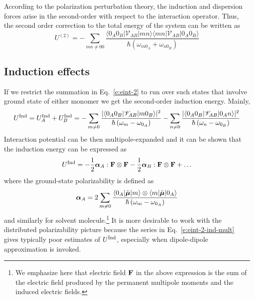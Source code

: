 \documentclass[a4paper,titlepage,twoside,fleqn,12pt]{book}
\newcommand{\BM}[1]{\ensuremath{\mbox{\boldmath${#1}$}}}
\begin{document}
\begin{refsection}
According to the polarization perturbation theory, the induction
and dispersion forces arise in the second\hyp{}order with respect to
the interaction 
operator.\citep{Stone.TheTheoryOfIntermolecularForces.1996,
Jeziorski.Moszynski.Szalewicz.ChemRev.1994} 
Thus, the second order correction to the total
energy of the system can be written as
%
\begin{equation} \label{e:eint-2}
U^{(2)} = - \sum_{mn\ne 00} \frac{
\langle 0_A0_B \lvert \mathscr{V}_{AB} \rvert mn \rangle \langle  mn \lvert \mathscr{V}_{AB} \rvert 0_A0_B \rangle
}{\hbar \left( \omega_{m0_A} + \omega_{n0_B}\right)}
\end{equation}
%

\subsection{Induction effects}

If we restrict the summation in Eq.~\eqref{e:eint-2} to run over such states
that involve ground state of either monomer
we get the second\hyp{}order induction energy. Mainly,
%
\begin{equation} \label{e:eint-2-ind}
U^{\rm Ind} = U^{\rm Ind}_A + U^{\rm Ind}_B =
- \sum_{m\ne 0} \frac{
\lvert \langle 0_A0_B \lvert \mathscr{V}_{AB} \rvert m0_B \rangle \rvert^2
}{\hbar \left( \omega_{m} - \omega_{0_A}\right)}
%
- \sum_{n\ne 0} \frac{
\lvert \langle 0_A0_B \lvert \mathscr{V}_{AB} \rvert 0_An \rangle \rvert^2
}{\hbar \left( \omega_{n} - \omega_{0_B}\right)}
\end{equation}
%
Interaction potential can be then multipole\hyp{}expanded and
it can be shown that the induction energy
can be expressed as
%
\begin{equation} \label{e:eint-2-ind-mult}
U^{\rm Ind} = - \frac{1}{2} {\BM \alpha}_A : {\bf F} \otimes {\bf F} 
              - \frac{1}{2} {\BM \alpha}_B : {\bf F} \otimes {\bf F} + \ldots
\end{equation}
% 
where the ground\hyp{}state polarizability is defined as
%
\begin{equation} \label{e:polarizability}
{\BM \alpha}_A = 2\sum_{m\neq 0} \frac{
\langle 0_A \lvert \hat{\BM \mu} \rvert m \rangle \otimes \langle m \lvert \hat{\BM \mu} \rvert 0_A \rangle 
}{\hbar \left( \omega_{m} - \omega_{0_A}\right)}
\end{equation}
%
and similarly for solvent molecule.\footnote{We emphasize here
that electric field $\bf F$ in the above expression
is the sum of the electric field produced by the permanent
multipole moments and the induced electric fields.}
It is more desirable to work with
the distributed polarizability picture because the series in 
Eq.~\eqref{e:eint-2-ind-mult} gives typically poor estimates of $U^{\rm Ind}$,
especially when dipole\hyp{}dipole approximation is invoked. 


\end{refsection}
\end{document}
